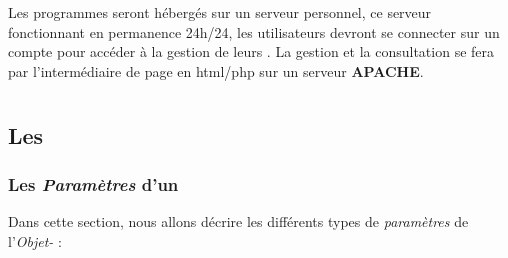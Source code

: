 \documentclass[french]{report}
\begin{document}
Les programmes seront hébergés sur un serveur personnel, ce serveur fonctionnant en permanence 24h/24, les utilisateurs devront se connecter sur un compte pour accéder à la gestion de leurs \CoCiX. La gestion et la consultation se fera par l'intermédiaire de page en html/php sur un serveur \textbf{APACHE}.

\part{\CoCiX}

\chapter{Les \CoCiX}
\section{Les \textit{Paramètres} d'un \CoCiX}\label{parametre}
Dans cette section, nous allons décrire les différents types de \textit{paramètres} de l'\textit{Objet-\CoCiX} :\\
\end{document}
